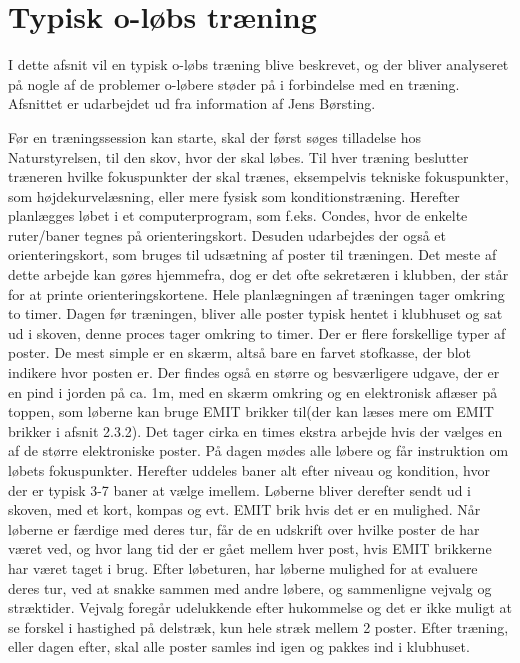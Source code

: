 \newpage
\section{Typisk o-løbs træning}
I dette afsnit vil en typisk o-løbs træning blive beskrevet, og der bliver analyseret på nogle af de problemer o-løbere støder på i forbindelse med en træning. Afsnittet er udarbejdet ud fra information af Jens Børsting.

Før en træningssession kan starte, skal der først søges tilladelse hos Naturstyrelsen, til den skov, hvor der skal løbes. \newline
Til hver træning beslutter træneren hvilke fokuspunkter der skal trænes, eksempelvis tekniske fokuspunkter, som højdekurvelæsning, eller mere fysisk som konditionstræning. Herefter planlægges løbet i et computerprogram, som f.eks. Condes, hvor de enkelte ruter/baner tegnes på orienteringskort. Desuden udarbejdes der også et orienteringskort, som bruges til udsætning af poster til træningen. Det meste af dette arbejde kan gøres hjemmefra, dog er det ofte sekretæren i klubben, der står for at printe orienteringskortene. Hele planlægningen af træningen tager omkring to timer. Dagen før træningen, bliver alle poster typisk hentet i klubhuset og sat ud i skoven, denne proces tager omkring to timer. Der er flere forskellige typer af poster. De mest simple er en skærm, altså bare en farvet stofkasse, der blot indikere hvor posten er. Der findes også en større og besværligere udgave, der er en pind i jorden på ca. 1m, med en skærm omkring og en elektronisk aflæser på toppen, som løberne kan bruge EMIT brikker til(der kan læses mere om EMIT brikker i afsnit 2.3.2). Det tager cirka en times ekstra arbejde hvis der vælges en af de større elektroniske poster.\newline
På dagen mødes alle løbere og får instruktion om løbets fokuspunkter. Herefter uddeles baner alt efter niveau og kondition, hvor der er typisk 3-7 baner at vælge imellem. Løberne bliver derefter sendt ud i skoven, med et kort, kompas og evt. EMIT brik hvis det er en mulighed. Når løberne er færdige med deres tur, får de en udskrift over hvilke poster de har været ved, og hvor lang tid der er gået mellem hver post, hvis EMIT brikkerne har været taget i brug.
Efter løbeturen, har løberne mulighed for at evaluere deres tur, ved at snakke sammen med andre løbere, og sammenligne vejvalg og stræktider. Vejvalg foregår udelukkende efter hukommelse og det er ikke muligt at se forskel i hastighed på delstræk, kun hele stræk mellem 2 poster. 
Efter træning, eller dagen efter, skal alle poster samles ind igen og pakkes ind i klubhuset.\newline


